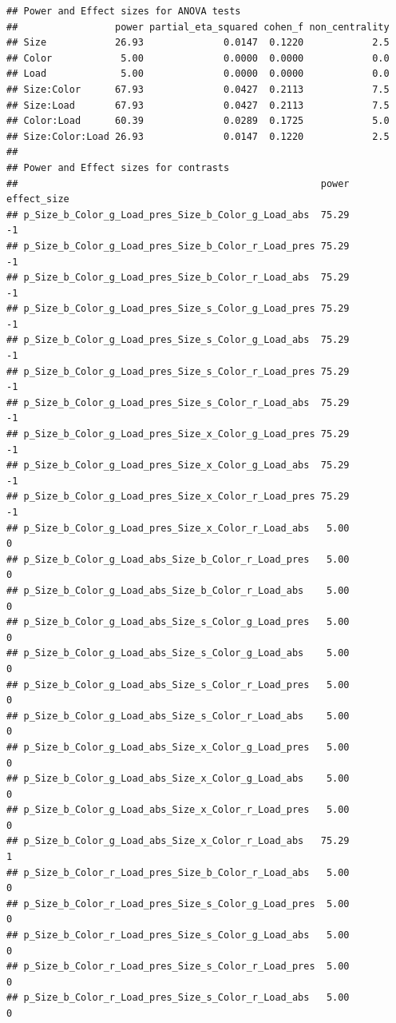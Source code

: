 \documentclass[]{book}
\begin{document}
\begin{verbatim}
## Power and Effect sizes for ANOVA tests
##                 power partial_eta_squared cohen_f non_centrality
## Size            26.93              0.0147  0.1220            2.5
## Color            5.00              0.0000  0.0000            0.0
## Load             5.00              0.0000  0.0000            0.0
## Size:Color      67.93              0.0427  0.2113            7.5
## Size:Load       67.93              0.0427  0.2113            7.5
## Color:Load      60.39              0.0289  0.1725            5.0
## Size:Color:Load 26.93              0.0147  0.1220            2.5
## 
## Power and Effect sizes for contrasts
##                                                     power effect_size
## p_Size_b_Color_g_Load_pres_Size_b_Color_g_Load_abs  75.29          -1
## p_Size_b_Color_g_Load_pres_Size_b_Color_r_Load_pres 75.29          -1
## p_Size_b_Color_g_Load_pres_Size_b_Color_r_Load_abs  75.29          -1
## p_Size_b_Color_g_Load_pres_Size_s_Color_g_Load_pres 75.29          -1
## p_Size_b_Color_g_Load_pres_Size_s_Color_g_Load_abs  75.29          -1
## p_Size_b_Color_g_Load_pres_Size_s_Color_r_Load_pres 75.29          -1
## p_Size_b_Color_g_Load_pres_Size_s_Color_r_Load_abs  75.29          -1
## p_Size_b_Color_g_Load_pres_Size_x_Color_g_Load_pres 75.29          -1
## p_Size_b_Color_g_Load_pres_Size_x_Color_g_Load_abs  75.29          -1
## p_Size_b_Color_g_Load_pres_Size_x_Color_r_Load_pres 75.29          -1
## p_Size_b_Color_g_Load_pres_Size_x_Color_r_Load_abs   5.00           0
## p_Size_b_Color_g_Load_abs_Size_b_Color_r_Load_pres   5.00           0
## p_Size_b_Color_g_Load_abs_Size_b_Color_r_Load_abs    5.00           0
## p_Size_b_Color_g_Load_abs_Size_s_Color_g_Load_pres   5.00           0
## p_Size_b_Color_g_Load_abs_Size_s_Color_g_Load_abs    5.00           0
## p_Size_b_Color_g_Load_abs_Size_s_Color_r_Load_pres   5.00           0
## p_Size_b_Color_g_Load_abs_Size_s_Color_r_Load_abs    5.00           0
## p_Size_b_Color_g_Load_abs_Size_x_Color_g_Load_pres   5.00           0
## p_Size_b_Color_g_Load_abs_Size_x_Color_g_Load_abs    5.00           0
## p_Size_b_Color_g_Load_abs_Size_x_Color_r_Load_pres   5.00           0
## p_Size_b_Color_g_Load_abs_Size_x_Color_r_Load_abs   75.29           1
## p_Size_b_Color_r_Load_pres_Size_b_Color_r_Load_abs   5.00           0
## p_Size_b_Color_r_Load_pres_Size_s_Color_g_Load_pres  5.00           0
## p_Size_b_Color_r_Load_pres_Size_s_Color_g_Load_abs   5.00           0
## p_Size_b_Color_r_Load_pres_Size_s_Color_r_Load_pres  5.00           0
## p_Size_b_Color_r_Load_pres_Size_s_Color_r_Load_abs   5.00           0

\end{verbatim}
\end{document}
